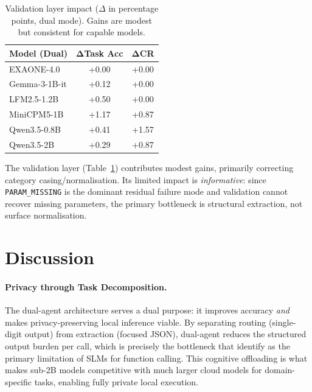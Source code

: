 \documentclass[11pt,twocolumn]{article}
\begin{document}
\begin{table}[t]
\centering
\small
\begin{tabular}{@{}lcc@{}}
\toprule
\textbf{Model (Dual)} & $\boldsymbol{\Delta}$\textbf{Task Acc} & $\boldsymbol{\Delta}$\textbf{CR} \\
\midrule
EXAONE-4.0     & +0.00 & +0.00 \\
Gemma-3-1B-it & +0.12 & +0.00 \\
LFM2.5-1.2B   & +0.50 & +0.00 \\
MiniCPM5-1B    & +1.17 & +0.87 \\
Qwen3.5-0.8B  & +0.41 & +1.57 \\
Qwen3.5-2B    & +0.29 & +0.87 \\
\bottomrule
\end{tabular}
\caption{Validation layer impact ($\Delta$ in percentage points, dual mode). Gains are modest but consistent for capable models.}
\label{tab:validation}
\end{table}

The validation layer (Table~\ref{tab:validation}) contributes modest gains, primarily correcting category casing/normalisation.
Its limited impact is \emph{informative}: since \texttt{PARAM\_MISSING} is the dominant residual failure mode and validation cannot recover missing parameters, the primary bottleneck is structural extraction, not surface normalisation.

\section{Discussion}
\label{sec:discussion}

\paragraph{Privacy through Task Decomposition.}
The dual-agent architecture serves a dual purpose: it improves accuracy \emph{and} makes privacy-preserving local inference viable.
By separating routing (single-digit output) from extraction (focused JSON), dual-agent reduces the structured output burden per call, which is precisely the bottleneck that \citet{kavathekar2025small} identify as the primary limitation of SLMs for function calling.
This cognitive offloading is what makes sub-2B models competitive with much larger cloud models for domain-specific tasks, enabling fully private local execution.
\end{document}
